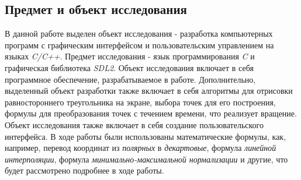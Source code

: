 \documentclass[14pt]{extarticle}
\begin{document}
{\begin{spacing}{1.5}
{        \subsection*{Предмет и объект исследования}
        \par
    }
    В данной работе выделен объект исследования - разработка компьютерных программ с графическим интерфейсом и пользовательским управлением на языках \textit{C/C++}. Предмет исследования - язык программирования \textit{C} и графическая библиотека \textit{SDL2}.
    Объект исследования включает в себя программное обеспечение, разрабатываемое в работе. Дополнительно, выделенный объект разработки также включает в себя алгоритмы для отрисовки равностороннего треугольника на экране, выбора точек для его построения, формулы для преобразования точек с течением времени, что реализует вращение. Объект исследования также включает в себя создание пользовательского интерфейса. В ходе работы были использованы математические формулы, как, например, перевод координат из \textit{полярных} в \textit{декартовые}, формула \textit{линейной интерполяции}, формула \textit{минимально-максимальной нормализации} и другие, что будет рассмотрено подробнее в ходе работы.
    \vfill
    \newpage
    \end{spacing}
}
\end{document}
